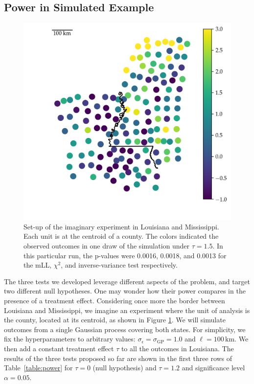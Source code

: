 \documentclass[letter,12pt]{article}
\newcommand{\sigmaf}{\sigma_{\mathrm{GP}}}
\newcommand{\sigman}{\sigma_{\epsilon}}
\begin{document}
\hypertarget{power-in-simulated-example}{%
\subsection{Power in Simulated Example}\label{power-in-simulated-example}}

\label{sec:powersim}



\begin{figure}[tbp]
    \centering
    \includegraphics[height=0.4\textheight]{../figures/mississippi_sim.png}
    \caption{\label{fig:mississippi_counties}Set-up of the imaginary experiment in Louisiana and Mississippi. Each unit is at the centroid of a county. The colors indicated the observed outcomes in one draw of the simulation under \(\tau=1.5\). In this particular run, the p-values were 0.0016, 0.0018, and 0.0013 for the mLL, \(\chi^2\), and inverse-variance test respectively.}
\end{figure}



The three tests we developed leverage different aspects of the problem, and target two different null hypotheses. One may wonder how their power compares in the presence of a treatment effect. Considering once more the border between Louisiana and Mississippi, we imagine an experiment where the unit of analysis is the county, located at its centroid, as shown in Figure \ref{fig:mississippi_counties}.
We will simulate outcomes from a single Gaussian process covering both states. For simplicity, we fix the hyperparameters to arbitrary values: \(\sigman=\sigmaf=1.0\) and \(\ell=100\,\mathrm{km}\).
We then add a constant treatment effect \(\tau\) to all the outcomes in Louisiana.
The results of the three tests proposed so far are shown in the first three rows of Table~\ref{table:power} for \(\tau=0\) (null hypothesis) and \(\tau=1.2\) and significance level \(\alpha=0.05\).
\end{document}
